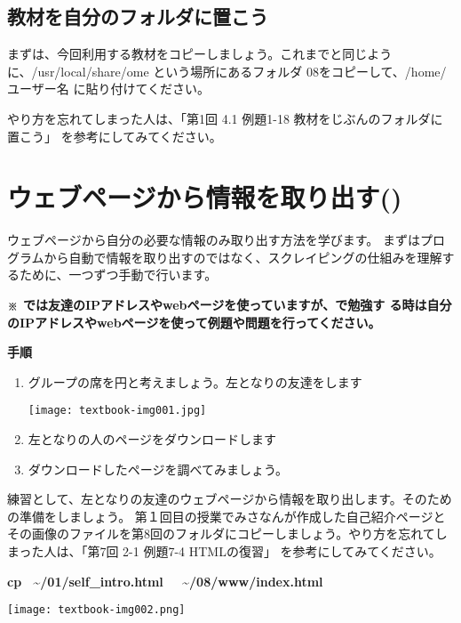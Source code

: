 \subsection*{教材を自分のフォルダに置こう}
まずは、今回利用する教材をコピーしましょう。これまでと同じように、/usr/local/share/ome という場所にあるフォルダ 08をコピーして、/home/ユーザー名 に貼り付けてください。

やり方を忘れてしまった人は、「第1回 4.1 例題1-18 教材をじぶんのフォルダに置こう」 を参考にしてみてください。

\clearpage
{}\label{P:intro}
\section{ウェブページから情報を取り出す()}
ウェブページから自分の必要な情報のみ取り出す方法を学びます。
まずはプログラムから自動で情報を取り出すのではなく、スクレイピングの仕組みを理解するために、一つずつ手動で行います。

{\bfseries\color[rgb]{1.0,0.2,0.2}
※ では友達のIPアドレスやwebページを使っていますが、で勉強す
る時は自分のIPアドレスやwebページを使って例題や問題を行ってください。
}

\noindent
{\bf 手順}
\begin{enumerate}

	\item グループの席を円と考えましょう。左となりの友達をします
  \begin{center}
    \texttt{[image: textbook-img001.jpg]}
  \end{center}
  \item 左となりの人のページをダウンロードします
  \item ダウンロードしたページを調べてみましょう。
\end{enumerate}

練習として、左となりの友達のウェブページから情報を取り出します。そのための準備をしましょう。
第１回目の授業でみさなんが作成した自己紹介ページとその画像のファイルを第8回のフォルダにコピーしましょう。やり方を忘れてしまった人は、「第7回 2-1 例題7-4 HTMLの復習」 を参考にしてみてください。

\textbf{cp \ {\textasciitilde}/01/self\_intro.html \ \ {\textasciitilde}/08/www/index.html}

\begin{center}
  \texttt{[image: textbook-img002.png]}
\end{center}

